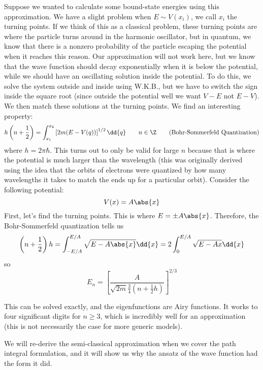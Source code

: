 \documentclass[a4paper,twoside,master.tex]{subfiles}
\begin{document}
Suppose we wanted to calculate some bound-state energies using this approximation. We have a slight problem when $ E \sim V(x_i) $, we call $ x_i $ the turning points. If we think of this as a classical problem, these turning points are where the particle turns around in the harmonic oscillator, but in quantum, we know that there is a nonzero probability of the particle escaping the potential when it reaches this reason. Our approximation will not work here, but we know that the wave function should decay exponentially when it is below the potential, while we should have an oscillating solution inside the potential. To do this, we solve the system outside and inside using W.K.B., but we have to switch the sign inside the square root (since outside the potential well we want $ V - E $ not $ E - V $). We then match these solutions at the turning points. We find an interesting property:
\begin{equation}\label{eq:bohr-sommerfeld-quantization}
    h\left( n+ \frac{1}{2} \right) = \int_{x_1}^{x_2} \left[ 2m (E-V(q)) \right]^{1/2} \dd{q}\qquad n \in \Z \tag{Bohr-Sommerfeld Quantization}
\end{equation}
where $ h = 2 \pi \hbar $. This turns out to only be valid for large $ n $ because that is where the potential is much larger than the wavelength (this was originally derived using the idea that the orbits of electrons were quantized by how many wavelengths it takes to match the ends up for a particular orbit). Consider the following potential:
\begin{equation}
    V(x) = A \abs{x}
\end{equation}
First, let's find the turning points. This is where $ E = \pm A \abs{x} $. Therefore, the Bohr-Sommerfeld quantization tells us
\begin{equation}
    \left( n + \frac{1}{2} \right) h = \int_{-E/A}^{E/A} \sqrt{E-A \abs{x}} \dd{x} = 2 \int_0^{E/A} \sqrt{E - Ax} \dd{x}
\end{equation}
so
\begin{equation}
    E_n = \left[ \frac{A}{\sqrt{2m} \frac{3}{4} \left( n+ \frac{1}{2} h \right)} \right]^{2/3}
\end{equation}

This can be solved exactly, and the eigenfunctions are Airy functions. It works to four significant digits for $ n \geq 3 $, which is incredibly well for an approximation (this is not necessarily the case for more generic models).

We will re-derive the semi-classical approximation when we cover the path integral formulation, and it will show us why the ansatz of the wave function had the form it did.
\end{document}
